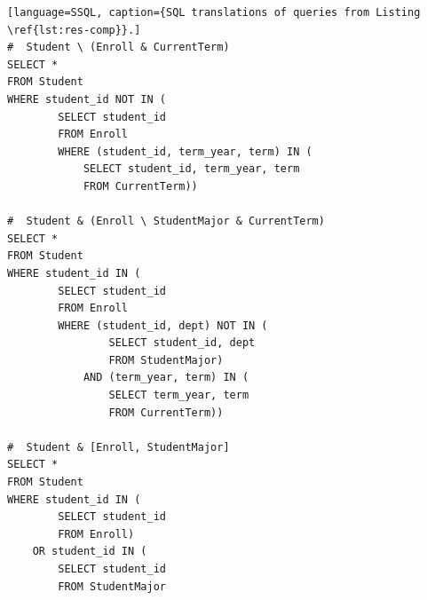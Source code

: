 \documentclass[letter,10pt]{article}
\begin{document}
\begin{appendices}
\begin{lstlisting}[language=SSQL, caption={SQL translations of queries from Listing \ref{lst:res-comp}}.]
#  Student \ (Enroll & CurrentTerm)
SELECT *
FROM Student
WHERE student_id NOT IN (
        SELECT student_id 
        FROM Enroll
        WHERE (student_id, term_year, term) IN (
            SELECT student_id, term_year, term
            FROM CurrentTerm))

#  Student & (Enroll \ StudentMajor & CurrentTerm)
SELECT *
FROM Student 
WHERE student_id IN (
        SELECT student_id 
        FROM Enroll
        WHERE (student_id, dept) NOT IN ( 
                SELECT student_id, dept 
                FROM StudentMajor)
            AND (term_year, term) IN (
                SELECT term_year, term
                FROM CurrentTerm))

#  Student & [Enroll, StudentMajor]
SELECT * 
FROM Student
WHERE student_id IN (
        SELECT student_id
        FROM Enroll)
    OR student_id IN (
        SELECT student_id
        FROM StudentMajor

\end{lstlisting}
\end{appendices}



\end{document}
